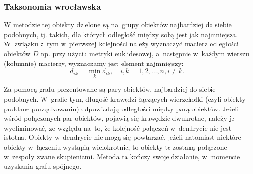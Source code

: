 \documentclass[12pt,a4paper]{report}
\begin{document}
\subsubsection{Taksonomia wrocławska}


W metodzie tej obiekty dzielone są na~grupy obiektów najbardziej do siebie podobnych, tj. takich, dla których odległość między sobą jest jak najmniejsza. W~związku z~tym w~pierwszej kolejności należy wyznaczyć macierz odległości obiektów $D$ np. przy użyciu metryki euklidesowej, a~następnie w~każdym wierszu (kolumnie) macierzy, wyznaczamy jest element najmniejszy: 
$$
d_{ik}= \min\limits_{k} {d_{ik}}, \quad i,k=1,2,\dots,n, i\neq k.
$$

Za pomocą grafu prezentowane są pary obiektów, najbardziej do siebie podobnych. W~grafie tym, długość krawędzi łączących wierzchołki (czyli obiekty poddane porządkowaniu) odpowiadają odległości między parą obiektów. Jeżeli wśród połączonych par obiektów, pojawią się krawędzie dwukrotne, należy je wyeliminować, ze względu na~to, że kolejność połączeń w~dendrycie nie jest istotna. Obiekty w~dendrycie nie mogą się powtarzać, jeżeli natomiast niektóre obiekty w~łączeniu wystąpią wielokrotnie, to obiekty te zostaną połączone w~zespoły zwane skupieniami. Metoda ta kończy swoje działanie, w~momencie uzyskania grafu spójnego. 
\end{document}
